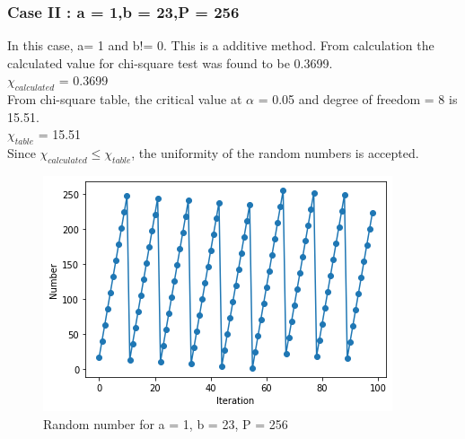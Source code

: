 \documentclass[10pt,journal,cspaper,compsoc]{IEEEtran}
\begin{document}
  \subsubsection*{Case II : a = 1,b = 23,P = 256}
  In this case, a= 1 and b!= 0. This is a additive method.
  From calculation the calculated value for chi-square test was found to be 0.3699.\\
  $\chi_{calculated}$ = 0.3699\\
  From chi-square table, the critical value at $\alpha$ = 0.05 and degree of freedom = 8 is 15.51.\\
  $\chi_{table}$ = 15.51\\
  Since $\chi_{calculated} \leq \chi_{table}$, the uniformity of the random numbers is accepted.
  \begin{figure}[h!]
    \centering
    \includegraphics[scale = 0.65]{images/Exp3_Example2.png}
    \caption{Random number for a = 1, b = 23, P = 256}
  \end{figure}
\end{document}
